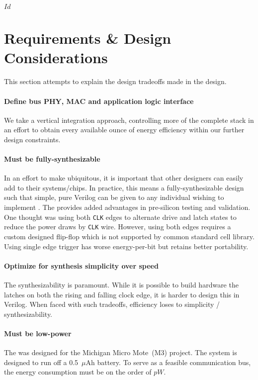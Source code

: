 \svnInfo $Id$

\section{Requirements \& Design Considerations}
\label{sec:requirements}
\label{sec:design}
This section attempts to explain the design tradeoffs made in the \bus design.

\paragraph{Define bus PHY, MAC and application logic interface}
We take a vertical integration approach, controlling more of the complete
stack in an effort to obtain every available ounce of energy efficiency within
our further design constraints.

\paragraph{Must be fully-synthesizable}
In an effort to make \bus ubiquitous, it is important that other designers can
easily add \bus to their systems/chips. In practice, this means a
fully-synthesizable design such that simple, pure Verilog can be given to any
individual wishing to implement \bus. The provides added advantages in
pre-silicon testing and validation. One thought was using both {\tt CLK} edges
to alternate {\sc drive} and {\sc latch} states to reduce the power draws by
{\tt CLK} wire. However, using both edges requires a custom designed flip-flop
which is not supported by common standard cell library. Using single edge 
trigger has worse energy-per-bit but retains better portability.

\paragraph{Optimize for synthesis simplicity over speed}
The synthesizability is paramount. While it is possible to build hardware the
latches on both the rising and falling clock edge, it is harder to design this
in Verilog. When faced with such tradeoffs, efficiency loses to simplicity /
synthesizability.

\paragraph{Must be low-power}
The \bus was designed for the Michigan Micro Mote~(M3) project. The system is
designed to run off a 0.5~$\mu$Ah battery. To serve as a feasible
communication bus, the energy consumption must be on the order of $pW$.

